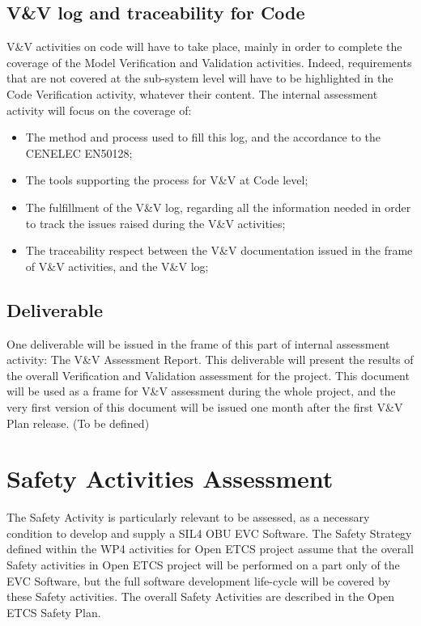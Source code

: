 \documentclass{template/openetcs_article}
\begin{document}
\subsection{V\&V log and traceability for Code}
V\&V activities on code will have to take place, mainly in order to complete the coverage of the Model Verification and Validation activities. Indeed, requirements that are not covered at the sub-system level will have to be highlighted in the Code Verification activity, whatever their content.
The internal assessment activity will focus on the coverage of:
\begin{itemize}
\item The method and process used to fill this log, and the accordance to the CENELEC EN50128;
\item The tools supporting the process for V\&V at Code level;
\item The fulfillment of the V\&V log, regarding all the information needed in order to track the issues raised during the V\&V activities;
\item The traceability respect between the V\&V documentation issued in the frame of V\&V activities, and the V\&V log;
\end{itemize}

\subsection{Deliverable}
One deliverable will be issued in the frame of this part of internal assessment activity: The V\&V Assessment Report. This deliverable will present the results of the overall Verification and Validation assessment for the project.
This document will be used as a frame for V\&V assessment during the whole project, and the very first version of this document will be issued one month after the first V\&V Plan release. (To be defined)

\section{Safety Activities Assessment}
The Safety Activity is particularly relevant to be assessed, as a necessary condition to develop and supply a SIL4 OBU EVC Software. The Safety Strategy defined within the WP4 activities for Open ETCS project assume that the overall Safety activities in Open ETCS project will be performed on a part only of the EVC Software, but the full software development life-cycle will be covered by these Safety activities.
The overall Safety Activities are described in the Open ETCS Safety Plan.
\end{document}
